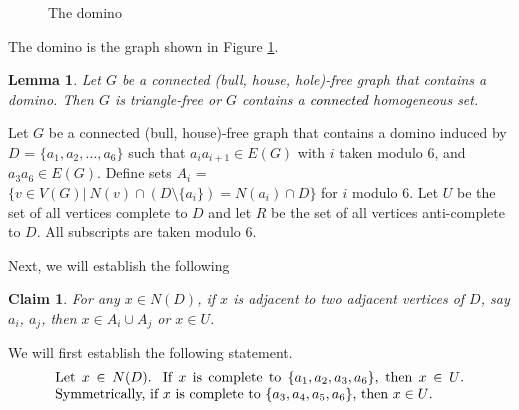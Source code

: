 \documentclass[a4paper,11pt]{article}
\newtheorem{lemma}[theorem]{Lemma}
\newtheorem{claim}[theorem]{Claim}
\theoremstyle{case}
\newcommand{\thecolor}{black}
\begin{document}
\begin{figure}
\newcommand{\ang}{17}
\newcommand{\sep}{15}
\caption{The domino}\label{fig:domino}
\end{figure}



The domino is the graph shown in Figure \ref{fig:domino}.
\begin{lemma}\label{lem:domino}
    Let $G$ be a connected (bull, house, hole)-free graph that contains a domino. Then $G$ is triangle-free or $G$ contains a \textcolor{\thecolor}{connected} homogeneous set.
\end{lemma}
    Let $G$ be a connected (bull, house)-free graph that contains a domino induced by $D$ = $\{a_1, a_2, \dots, a_6\}$ such that $a_ia_{i+1}\in E(G)$ with $i$ taken modulo 6, and $a_3a_6\in E(G)$. Define sets $A_i$ = $\{v\in V(G)|~ N(v)\cap (D\setminus \{a_i\}) = N(a_i)\cap D\}$ for $i$ modulo 6. Let $U$ be the set of all vertices complete to $D$ and let $R$ be the set of all vertices anti-complete to $D$. All subscripts are taken modulo 6.

Next, we will establish the following
    \begin{claim}\label{Claim1}
        For any $x\in N(D)$, if $x$ is adjacent to two adjacent vertices of $D$, say $a_i$, $a_j$, then $x\in A_i\cup A_j$ or $x\in U$.
    \end{claim}
%   
We will first establish the following statement.   
\begin{equation}\label{eq:see-four}
	\text{\parbox{.85\textwidth}{
    Let $x\in N(D)$. If $x$ is complete to $\{ a_1, a_2, a_3, a_6\}$, then $x \in U$. Symmetrically, if $x$ is complete to $\{ a_3, a_4, a_5, a_6\}$, then $x \in U$.
    }}
\end{equation}
    
\end{document}

